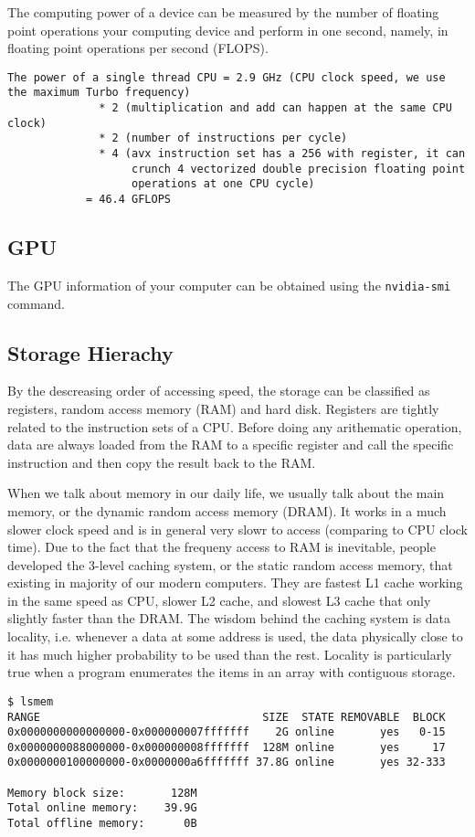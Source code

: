 \documentclass[superscriptaddress]{revtex4-2}
\begin{document}
The computing power of a device can be measured by the number of floating point operations your computing device and perform in one second, namely, in floating point operations per second (FLOPS).
\begin{lstlisting}
The power of a single thread CPU = 2.9 GHz (CPU clock speed, we use the maximum Turbo frequency)
			  * 2 (multiplication and add can happen at the same CPU clock)
			  * 2 (number of instructions per cycle)
		      * 4 (avx instruction set has a 256 with register, it can
                   crunch 4 vectorized double precision floating point
				   operations at one CPU cycle)
			= 46.4 GFLOPS
\end{lstlisting}

\subsection{GPU}
The GPU information of your computer can be obtained using the \texttt{nvidia-smi} command.

\subsection{Storage Hierachy}
By the descreasing order of accessing speed, the storage can be classified as registers, random access memory (RAM) and hard disk.
Registers are tightly related to the instruction sets of a CPU.
Before doing any arithematic operation,
data are always loaded from the RAM to a specific register and call the specific instruction and then copy the result back to the RAM.

When we talk about memory in our daily life, we usually talk about the main memory, or the dynamic random access memory (DRAM).
It works in a much slower clock speed and is in general very slowr to access (comparing to CPU clock time).
Due to the fact that the frequeny access to RAM is inevitable, people developed the 3-level caching system, or the static random access memory, that existing in majority of our modern computers.
They are fastest L1 cache working in the same speed as CPU, slower L2 cache, and slowest L3 cache that only slightly faster than the DRAM.
The wisdom behind the caching system is data locality, i.e. whenever a data at some address is used, the data physically close to it has much higher probability to be used than the rest.
Locality is particularly true when a program enumerates the items in an array with contiguous storage.

\begin{lstlisting}
$ lsmem
RANGE                                  SIZE  STATE REMOVABLE  BLOCK
0x0000000000000000-0x000000007fffffff    2G online       yes   0-15
0x0000000088000000-0x000000008fffffff  128M online       yes     17
0x0000000100000000-0x0000000a6fffffff 37.8G online       yes 32-333

Memory block size:       128M
Total online memory:    39.9G
Total offline memory:      0B
\end{lstlisting}

\end{document}
